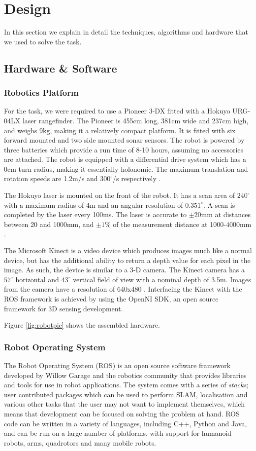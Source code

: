 \documentclass[conference]{IEEEtran}
\begin{document}
\section{Design}
In this section we explain in detail the techniques, algorithms and hardware that we used to solve the task.
\subsection{Hardware \& Software}
\subsubsection{Robotics Platform}

For the task, we were required to use a Pioneer 3-DX fitted with a Hokuyo URG-04LX laser rangefinder. The Pioneer is 455cm long, 381cm wide and 237cm high, and weighs 9kg, making it a relatively compact platform. It is fitted with six forward mounted and two side mounted sonar sensors. The robot is powered by three batteries which provide a run time of 8-10 hours, assuming no accessories are attached. The robot is equipped with a differential drive system which has a 0cm turn radius, making it essentially holonomic. The maximum translation and rotation speeds are 1.2m/s and 300$^\circ$/s respectively \cite{pioneer}. 

The Hokuyo laser is mounted on the front of the robot. It has a scan area of $240^\circ$ with a maximum radius of 4m and an angular resolution of $0.351^\circ$. A scan is completed by the laser every 100ms. The laser is accurate to $\pm 20$mm at distances between 20 and 1000mm, and $\pm 1$\% of the measurement distance at 1000-4000mm \cite{hokuyo}.

The Microsoft Kinect is a video device which produces images much like a normal device, but has the additional ability to return a depth value for each pixel in the image. As such, the device is similar to a 3-D camera. The Kinect camera has a $57^\circ$ horizontal and $43^\circ$ vertical field of view with a nominal depth of 3.5m. Images from the camera have a resolution of 640x480 \cite{Kinect}. Interfacing the Kinect with the ROS framework is achieved by using the OpenNI SDK, an open source framework for 3D sensing development.

Figure \ref{fig:robotpic} shows the assembled hardware.
\subsubsection{Robot Operating System}
The Robot Operating System (ROS) is an open source software framework developed by Willow Garage and the robotics community that provides libraries and tools for use in robot applications. The system comes with a series of \emph{stacks}; user contributed packages which can be used to perform SLAM, localisation and various other tasks that the user may not want to implement themselves, which means that development can be focused on solving the problem at hand. ROS code can be written in a variety of languages, including C++, Python and Java, and can be run on a large number of platforms, with support for humanoid robots, arms, quadrotors and many mobile robots.
\end{document}
